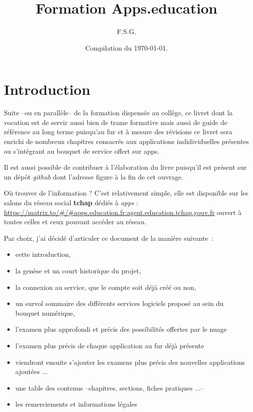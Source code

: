 \documentclass[a4paper, 11pt]{book}
\title{Formation Apps.education}
\author{F.S.G.}
\date{Compilation du \today{}.}
\begin{document}
\begin{titlepage}
    \maketitle
\end{titlepage}

\chapter*{Introduction}

Suite --ou en parallèle-- de la formation dispensée au collège, ce livret dont la vocation est de servir aussi bien de trame formative mais aussi de guide de référence au long terme puisqu'au fur et à mesure des révisions ce livret sera enrichi de nombreux chapitres consacrés aux applications indidividuelles présentes ou s'intégrant au bouquet de service offert sur apps.

Il est aussi possible de contribuer à l'élaboration du livre puisqu'il est présent sur un dépôt \emph{github} dont l'adresse figure à la fin de cet ouvrage. 

Où trouver de l'information ? C'est relativement simple, elle est disponible sur les salons du réseau social \textbf{tchap} dédiés à \emph{apps} : \url{https://matrix.to/#/#apps.education.fr:agent.education.tchap.gouv.fr} ouvert à toutes celles et ceux pouvant accéder au réseau.

Par choix, j'ai décidé d'articuler ce document de la manière suivante~:
\begin{itemize}
	\item cette introduction,
	\item la genèse et un court historique du projet,
	\item la connexion au service, que le compte soit déjà créé ou non,
	\item un survol sommaire des différents services logiciels proposé au sein du bouquet numérique,
	\item l'examen plus approfondi et précis des possibilités offertes par le nuage
	\item l'examen plus précis de chaque application au fur déjà présente
	\item viendront ensuite s'ajouter les examens plus précis des nouvelles applications ajoutées ...
	\item une table des contenus --chapitres, sections, fiches pratiques ...-- 
	\item les remerciements et informations légales
\end{itemize}
\end{document}
